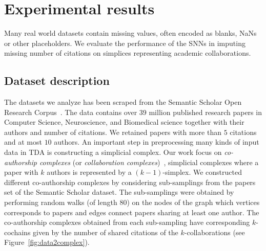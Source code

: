 \section{Experimental results}
Many real world datasets contain missing values, often encoded as blanks, NaNs or other placeholders. We evaluate the performance of the SNNs in imputing missing number of citations on simplices representing academic collaborations.

\subsection{Dataset description}
The datasets we analyze has been scraped from the Semantic Scholar Open Research Corpus~\cite{ammar18NAACL}. The data contains over 39 million published research papers in Computer Science, Neuroscience, and Biomedical science together with their authors and number of citations. We retained papers with more than $5$ citations and at most $10$ authors. An important step in preprocessing many kinds of input data in TDA is constructing a simplicial complex. Our work focus on \emph{co-authorship complexes} (or \emph{collaboration complexes})~\cite{patania2017}, simplicial complexes where a paper with $k$ authors is represented by a $(k-1)$-simplex. We constructed different co-authorship complexes by considering sub-samplings from the papers set of the Semantic Scholar dataset. The sub-samplings were obtained by performing random walks (of length $80$) on the nodes of the graph which vertices corresponds to papers and edges connect papers sharing at least one author. The co-authorship complexes obtained from each sub-sampling have corresponding $k$-cochains given by the number of shared citations of the $k$-collaborations (see Figure~\ref{fig:data2complex}).

